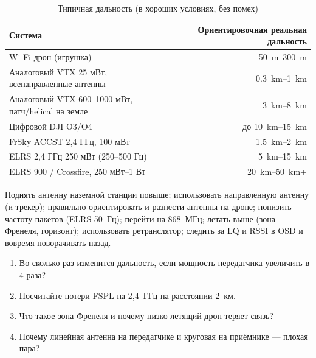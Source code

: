 \begin{table}[H]\centering\small
\renewcommand{\arraystretch}{1.2}
\begin{tabular}{@{}lr@{}}
\toprule
\textbf{Система} & \textbf{Ориентировочная реальная дальность} \\
\midrule
Wi-Fi-дрон (игрушка) & \SIrange{50}{300}{\metre} \\
Аналоговый VTX 25 мВт, всенаправленные антенны & \SIrange{0.3}{1}{\kilo\metre} \\
Аналоговый VTX 600–1000 мВт, патч/helical на земле & \SIrange{3}{8}{\kilo\metre} \\
Цифровой DJI O3/O4 & до \SIrange{10}{15}{\kilo\metre} \\
FrSky ACCST 2,4 ГГц, 100 мВт & \SIrange{1.5}{2}{\kilo\metre} \\
ELRS 2,4 ГГц 250 мВт (250–500 Гц) & \SIrange{5}{15}{\kilo\metre} \\
ELRS 900 / Crossfire, 250 мВт–1 Вт & \SIrange{20}{50}{\kilo\metre}+ \\
\bottomrule
\end{tabular}
\caption{Типичная дальность (в хороших условиях, без помех)}
\end{table}

\begin{keybox}
Поднять антенну наземной станции повыше; использовать направленную антенну (и трекер); правильно ориентировать и разнести антенны на дроне; понизить частоту пакетов (ELRS 50~Гц); перейти на 868~МГц; летать выше (зона Френеля, горизонт); использовать ретранслятор; следить за LQ и RSSI в OSD и вовремя поворачивать назад.
\end{keybox}

\begin{exam}
\begin{enumerate}
\item Во сколько раз изменится дальность, если мощность передатчика увеличить в 4 раза?
\item Посчитайте потери FSPL на 2,4~ГГц на расстоянии 2~км.
\item Что такое зона Френеля и почему низко летящий дрон теряет связь?
\item Почему линейная антенна на передатчике и круговая на приёмнике — плохая пара?
\end{enumerate}
\end{exam}
